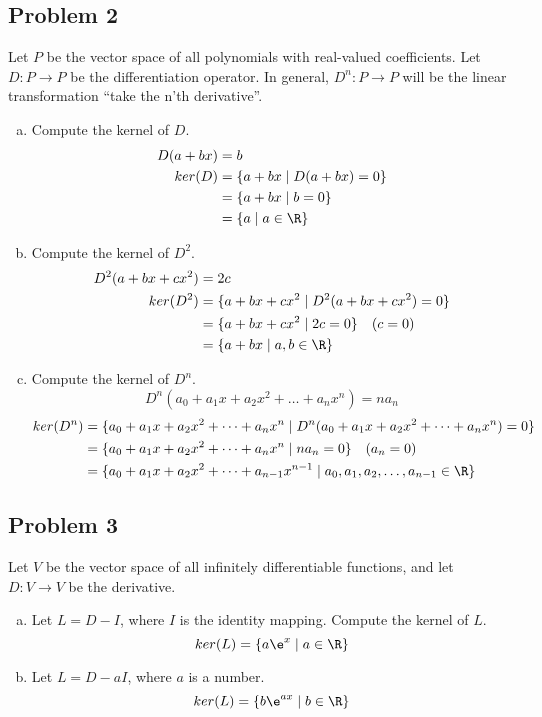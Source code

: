 \documentclass{math}
\begin{document}
\subsection*{Problem 2}
Let \( P \) be the vector space of all polynomials with real-valued
coefficients. Let \( D:P\to P \) be the differentiation operator. In general,
\( D^n:P\to P \) will be the linear transformation ``take the n'th derivative''.
\begin{enumerate}[(a)]
  \item Compute the kernel of \( D \).
  \begin{align*}
    D(a+bx) &= b \\
    ker(D) &= \{a+bx\mid D(a+bx) = 0\} \\
    &= \{a+bx\mid b = 0\} \\
    &= \{a\mid a\in\R\}
  \end{align*}
  \item Compute the kernel of \( D^2 \).
  \begin{align*}
    D^2(a+bx+cx^2) &= 2c \\
    ker(D^2) &= \{a+bx+cx^2\mid D^2(a+bx+cx^2) = 0\} \\
    &= \{a+bx+cx^2\mid 2c = 0\} \quad (c = 0) \\
    &= \{a+bx\mid a,b\in\R\}
  \end{align*}
  \item Compute the kernel of \( D^n \).
  \[ D^n(a_0+a_1x+a_2x^2+\dots+a_nx^n) = na_n \]
  \begin{align*}
    ker(D^n) &= \{a_0+a_1x+a_2x^2+\dots+a_nx^n\mid
      D^n(a_0+a_1x+a_2x^2+\dots+a_nx^n) = 0\} \\
    &= \{a_0+a_1x+a_2x^2+\dots+a_nx^n\mid na_n = 0\} \quad (a_n = 0) \\
    &= \{a_0+a_1x+a_2x^2+\dots+a_{n-1}x^{n-1}\mid
      a_0,a_1,a_2,\dots,a_{n-1}\in\R\} \\
  \end{align*}
\end{enumerate}

\subsection*{Problem 3}
Let \( V \) be the vector space of all infinitely differentiable functions, and
let \( D:V\to V \) be the derivative.
\begin{enumerate}[(a)]
  \item Let \( L = D-I \), where \( I \) is the identity mapping. Compute the
  kernel of \( L \).
  \[ ker(L) = \{ a\e^x\mid a\in\R\} \]
  \item Let \( L = D-aI \), where \( a \) is a number.
  \[ ker(L) = \{ b\e^{ax}\mid b\in\R\} \]
\end{enumerate}
\end{document}
